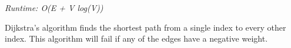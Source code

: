 
\textit{Runtime: O(E + V log(V))}

Dijkstra’s algorithm finds the shortest path from a single index to every other index. This algorithm will fail if any of the edges have a negative weight.



\newpage
